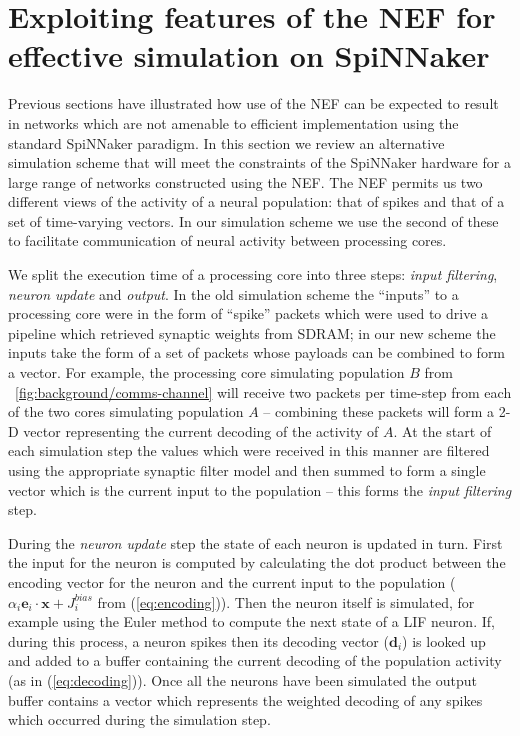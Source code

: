 \documentclass[conference]{IEEEtran}
\renewcommand{\vec}{\mathbf}  %
\begin{document}
  \section{Exploiting features of the NEF for effective simulation on SpiNNaker}
  \label{sec:exploiting}
  Previous sections have illustrated how use of the NEF can be expected to result in networks which are not amenable to efficient implementation using the standard SpiNNaker paradigm.
  In this section we review an alternative simulation scheme that will meet the constraints of the SpiNNaker hardware for a large range of networks constructed using the NEF.
  The NEF permits us two different views of the activity of a neural population: that of spikes and that of a set of time-varying vectors.
  In our simulation scheme we use the second of these to facilitate communication of neural activity between processing cores.

  We split the execution time of a processing core into three steps: \textit{input filtering}, \textit{neuron update} and \textit{output}.
  In the old simulation scheme the ``inputs'' to a processing core were in the form of ``spike'' packets which were used to drive a pipeline which retrieved synaptic weights from SDRAM; in our new scheme the inputs take the form of a set of packets whose payloads can be combined to form a vector.
  For example, the processing core simulating population $B$ from \figurename~\ref{fig:background/comms-channel} will receive two packets per time-step from each of the two cores simulating population $A$ -- combining these packets will form a 2-D vector representing the current decoding of the activity of $A$.
  At the start of each simulation step the values which were received in this manner are filtered using the appropriate synaptic filter model and then summed to form a single vector which is the current input to the population -- this forms the \textit{input filtering} step.

  During the \textit{neuron update} step the state of each neuron is updated in turn.
  First the input for the neuron is computed by calculating the dot product between the encoding vector for the neuron and the current input to the population ($\alpha_i \vec{e}_i \cdot \vec{x} + J^{bias}_i$ from (\ref{eq:encoding})).
  Then the neuron itself is simulated, for example using the Euler method to compute the next state of a LIF neuron.
  If, during this process, a neuron spikes then its decoding vector ($\vec{d}_i$) is looked up and added to a buffer containing the current decoding of the population activity (as in (\ref{eq:decoding})).
  Once all the neurons have been simulated the output buffer contains a vector which represents the weighted decoding of any spikes which occurred during the simulation step.
\end{document}
